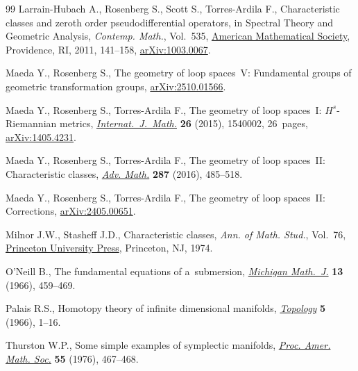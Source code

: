 \documentclass[10pt,a4paper]{amsart}
\numberwithin{equation}{section}
\theoremstyle{definition}
\begin{document}
\begin{thebibliography}{99}
Larrain-Hubach A., Rosenberg S., Scott S., Torres-Ardila F., Characteristic
 classes and zeroth order pseudodifferential operators, in Spectral Theory and
 Geometric Analysis, \textit{Contemp. Math.}, Vol.~535,
 \href{https://doi.org/10.1090/conm/535/10539}{American Mathematical Society},
 Providence, RI, 2011, 141--158,
 \href{http://arxiv.org/abs/1003.0067}{arXiv:1003.0067}.

Maeda Y., Rosenberg S., The geometry of loop spaces~{V}: {F}undamental groups
 of geometric transformation groups,
 \href{http://arxiv.org/abs/2510.01566}{arXiv:2510.01566}.

Maeda Y., Rosenberg S., Torres-Ardila F., The geometry of loop spaces~{I}:
 {$H^s$}-{R}iemannian metrics,
 \href{https://doi.org/10.1142/S0129167X15400029}{\textit{Internat.~J.~Math.}}
 \textbf{26} (2015), 1540002, 26~pages,
 \href{http://arxiv.org/abs/1405.4231}{arXiv:1405.4231}.

Maeda Y., Rosenberg S., Torres-Ardila F., The geometry of loop spaces~{II}:
 {C}haracteristic classes,
 \href{https://doi.org/10.1016/j.aim.2015.10.001}{\textit{Adv. Math.}}
 \textbf{287} (2016), 485--518.

Maeda Y., Rosenberg S., Torres-Ardila F., The geometry of loop spaces~{II}: {C}orrections,
 \href{http://arxiv.org/abs/2405.00651}{arXiv:2405.00651}.


Milnor J.W., Stasheff J.D., Characteristic classes, \textit{Ann. of Math.
 Stud.}, Vol.~76, \href{https://doi.org/10.1515/9781400881826}{Princeton
 University Press}, Princeton, NJ, 1974.

O'Neill B., The fundamental equations of a~submersion,
 \href{https://doi.org/10.1307/mmj/1028999604}{\textit{Michigan Math.~J.}}
 \textbf{13} (1966), 459--469.

Palais R.S., Homotopy theory of infinite dimensional manifolds,
 \href{https://doi.org/10.1016/0040-9383(66)90002-4}{\textit{Topology}}
 \textbf{5} (1966), 1--16.

Thurston W.P., Some simple examples of symplectic manifolds,
 \href{https://doi.org/10.2307/2041749}{\textit{Proc. Amer. Math. Soc.}}
 \textbf{55} (1976), 467--468.

\end{thebibliography}
\end{document}

